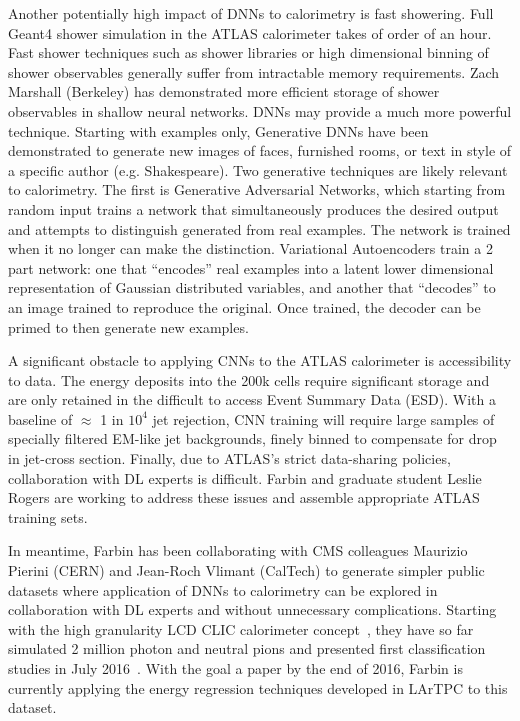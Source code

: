 Another potentially high impact of DNNs to calorimetry is fast
showering. Full Geant4 shower simulation in the ATLAS calorimeter
takes of order of an hour. Fast shower techniques such as shower
libraries or high dimensional binning of shower observables generally
suffer from intractable memory requirements. Zach Marshall (Berkeley)
has demonstrated more efficient storage of shower observables in
shallow neural networks. DNNs may provide a much more powerful
technique.  Starting with examples only, Generative DNNs have been
demonstrated to generate new images of faces, furnished rooms, or text
in style of a specific author (e.g. Shakespeare). Two generative
techniques are likely relevant to calorimetry. The first is Generative
Adversarial Networks, which starting from random input trains a
network that simultaneously produces the desired output and attempts
to distinguish generated from real examples. The network is trained
when it no longer can make the distinction. Variational Autoencoders
train a 2 part network: one that ``encodes'' real examples into a
latent lower dimensional representation of Gaussian distributed
variables, and another that ``decodes'' to an image trained to
reproduce the original. Once trained, the decoder can be primed to
then generate new examples.

A significant obstacle to applying CNNs to the ATLAS calorimeter is
accessibility to data. The energy deposits into the 200k cells require
significant storage and are only retained in the difficult to access
Event Summary Data (ESD). With a baseline of $\approx$ 1 in $10^4$ jet
rejection, CNN training will require large samples of specially
filtered EM-like jet backgrounds, finely binned to compensate for
drop in jet-cross section. Finally, due to ATLAS's strict data-sharing
policies, collaboration with DL experts is difficult. Farbin and
graduate student Leslie Rogers are working to address these issues and
assemble appropriate ATLAS training sets.

In meantime, Farbin has been collaborating with CMS colleagues
Maurizio Pierini (CERN) and Jean-Roch Vlimant (CalTech) to generate
simpler public datasets where application of DNNs to calorimetry can
be explored in collaboration with DL experts and without unnecessary
complications. Starting with the high granularity LCD CLIC calorimeter
concept~\cite{2012arXiv1202.5940L}, they have so far simulated 2 million photon and neutral
pions and presented first classification studies in July
2016~\cite{LCDSimonsDL}. With the goal a paper by the end of 2016, Farbin is
currently applying the energy regression techniques developed in
LArTPC to this dataset.

